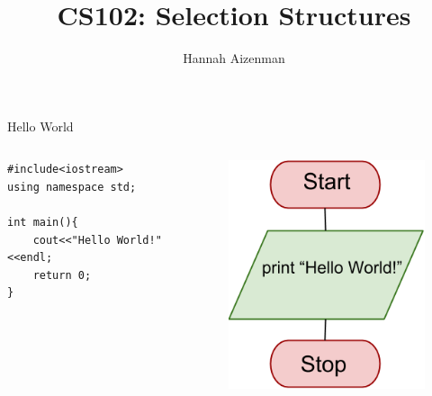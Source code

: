 \documentclass[xcolor={dvipsnames}]{beamer}
\begin{document}
\title{ CS102: Selection Structures}
\author{Hannah Aizenman}


\begin{frame}
	\titlepage
\end{frame}

\begin{frame}[fragile]{Hello World}
\begin{columns}
\begin{column}{0.5\textwidth}
\begin{verbatim}
#include<iostream>
using namespace std;

int main(){
    cout<<"Hello World!"<<endl;
    return 0;
}
\end{verbatim}
  \end{column}
  \begin{column}{0.5\textwidth}
	\pause
	\begin{figure}
		\includegraphics[width=1\textwidth]{hello}
	\end{figure}
  \end{column}
\end{columns}
\end{frame}
\end{document}
